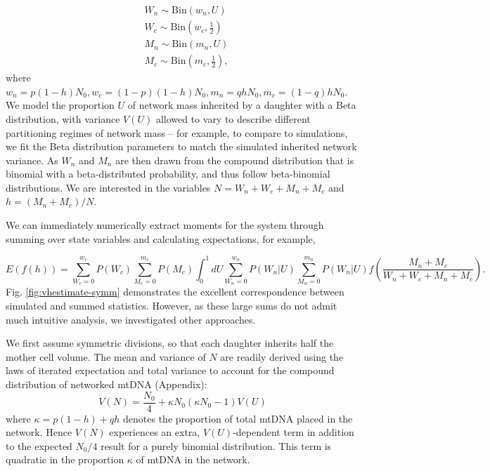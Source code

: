 \documentclass{article}
\begin{document}
\begin{equation}\label{eq:model}
    \begin{split}
        & W_n \sim \mathrm{Bin}\left(w_n,U\right) \\
        & W_c \sim \mathrm{Bin}\left(w_c,\frac{1}{2}\right) \\
        & M_n \sim \mathrm{Bin}\left(m_n,U\right) \\
        & M_c \sim \mathrm{Bin}\left(m_c,\frac{1}{2}\right),
    \end{split}
\end{equation}
where $w_n = p(1-h)N_0, w_c = (1-p)(1-h)N_0, m_n = qhN_0, m_c = (1-q)hN_0$. We model the proportion $U$ of network mass inherited by a daughter with a Beta distribution, with variance $V(U)$ allowed to vary to describe different partitioning regimes of network mass -- for example, to compare to simulations, we fit the Beta distribution parameters to match the simulated inherited network variance. As $W_n$ and $M_n$ are then drawn from the compound distribution that is binomial with a beta-distributed probability, and thus follow beta-binomial distributions. We are interested in the variables $N = W_n+W_c+M_n+M_c$ and $h = (M_n+M_c)/N$.

We can immediately numerically extract moments for the system through summing over state variables and calculating expectations, for example, 

\begin{equation}\label{eq:vh-estimate-moments}
    E(f(h)) = \sum_{W_c = 0}^{w_c} P(W_c) \sum_{M_c = 0}^{m_c} P(M_c) \int_0^1 dU \sum_{W_n = 0}^{w_n} P(W_n|U) \sum_{M_n = 0}^{m_n} P(W_n|U) f\left(\frac{M_n+M_c}{W_n+W_c+M_n+M_c}\right).
\end{equation}
Fig. \ref{fig:vhestimate-symm} demonstrates the excellent correspondence between simulated and summed statistics. However, as these large sums do not admit much intuitive analysis, we investigated other approaches. 

We first assume symmetric divisions, so that each daughter inherits half the mother cell volume. The mean and variance of $N$ are readily derived using the laws of iterated expectation and total variance to account for the compound distribution of networked mtDNA (Appendix):
\begin{equation}
    V(N)=\frac{N_0}{4}+\kappa N_0(\kappa N_0-1)V(U)
\end{equation}
where $\kappa = p(1-h)+qh$ denotes the proportion of total mtDNA placed in the network. Hence $V(N)$ experiences an extra, $V(U)$-dependent term in addition to the expected $N_0/4$ result for a purely binomial distribution. This term is quadratic in the proportion $\kappa$ of mtDNA in the network.
\end{document}
